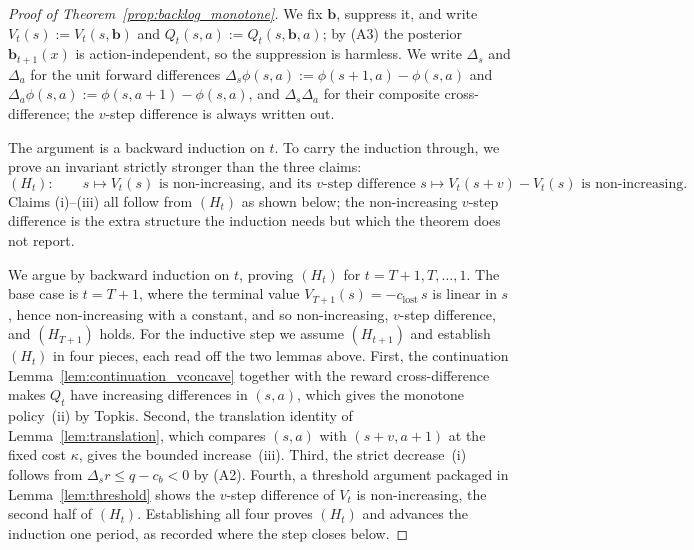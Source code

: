 \documentclass[preprint,11pt,authoryear]{elsarticle}
\newcommand{\bvec}[1]{\mathbf{#1}}
\theoremstyle{remark}
\begin{document}
\thmBacklog*

\begin{proof}[Proof of Theorem~\ref{prop:backlog_monotone}]
We fix $\bvec{b}$, suppress it, and write $V_t(s) := V_t(s,\bvec{b})$ and $Q_t(s,a) := Q_t(s,\bvec{b},a)$; by (A3) the posterior $\bvec{b}_{t+1}(x)$ is action-independent, so the suppression is harmless. We write $\Delta_s$ and $\Delta_a$ for the unit forward differences $\Delta_s\phi(s,a):=\phi(s+1,a)-\phi(s,a)$ and $\Delta_a\phi(s,a):=\phi(s,a+1)-\phi(s,a)$, and $\Delta_s\Delta_a$ for their composite cross-difference; the $v$-step difference is always written out.

The argument is a backward induction on $t$. To carry the induction through, we prove an invariant strictly stronger than the three claims:
\[
(H_t): \qquad s \mapsto V_t(s) \text{ is non-increasing, and its $v$-step difference } s \mapsto V_t(s+v) - V_t(s) \text{ is non-increasing.}
\]
Claims (i)--(iii) all follow from $(H_t)$ as shown below; the non-increasing $v$-step difference is the extra structure the induction needs but which the theorem does not report.

We argue by backward induction on $t$, proving $(H_t)$ for $t = T+1, T, \ldots, 1$. The base case is $t = T+1$, where the terminal value $V_{T+1}(s) = -c_{\mathrm{lost}}\,s$ is linear in $s$, hence non-increasing with a constant, and so non-increasing, $v$-step difference, and $(H_{T+1})$ holds. For the inductive step we assume $(H_{t+1})$ and establish $(H_t)$ in four pieces, each read off the two lemmas above. First, the continuation Lemma~\ref{lem:continuation_vconcave} together with the reward cross-difference makes $Q_t$ have increasing differences in $(s,a)$, which gives the monotone policy~(ii) by Topkis. Second, the translation identity of Lemma~\ref{lem:translation}, which compares $(s,a)$ with $(s+v,a+1)$ at the fixed cost $\kappa$, gives the bounded increase~(iii). Third, the strict decrease~(i) follows from $\Delta_s r \le q - c_b < 0$ by (A2). Fourth, a threshold argument packaged in Lemma~\ref{lem:threshold} shows the $v$-step difference of $V_t$ is non-increasing, the second half of $(H_t)$. Establishing all four proves $(H_t)$ and advances the induction one period, as recorded where the step closes below.


\end{proof}
\end{document}
